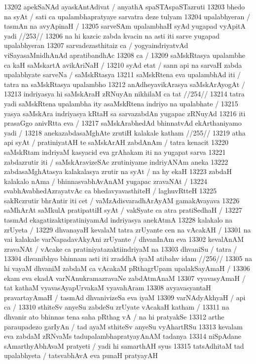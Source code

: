 13202 apekSaNAd ayaskAntAdivat / anyathA spaSTAspaSTazruti  
13203 bhedo na syAt / sati ca upalambhapratyaye sarvatra deze tulyam 
13204 upalabhyeran / tasmAn na avyApinaH /
13205 	sarveSAm upalambhaH syAd yugapad vyApitA yadi //253//
13206 na hi kazcic zabda kvacin na asti iti sarve yugapad upalabhyeran 
13207 sarvadezasthitaiz ca / yogyaindriyatvAd viSayasaMnidhAnAd apratibandhAc
13208 ca / 
13209 	saMskRtasya upalambhe ca kaH saMskartA avikAriNaH / 
13210 syAd etat / sann api na sarvaH zabda upalabhyate sarveNa / saMskRtasya
13211 saMskRtena eva upalambhAd iti / tatra na saMskRtasya upalambho  
13212 anAdheyavikArasya saMskArAyogAt /  
13213 	indriyasya hi saMskAraH zRNuyAn nikhilaM ca tat //254//
13214 tatra yadi saMskRtena upalambha ity asaMskRtena indriyo na upalabhate /
13215 yasya saMskAra indriyasya kRtaH sa sarvazabdAn yugapac zRNuyAd  
13216 iti prasaGgo anivRtta eva /  
13217 	saMskArabhedAd bhinnatvAd ekArthaniyamo yadi / 
13218 	anekazabdasaMghAte zrutiH kalakale katham //255//  
13219 atha api syAt / pratiniyatAH te saMskArAH zabdAnAm / tatra kenacit  
13220 saMskRtam indriyaM kasyacid eva grAhakam iti na yugapat sarva  
13221 zabdazrutir iti / saMskAravizeSAc zrutiniyame indriyANAm aneka 
13222 zabdasaMghAtasya kalakalasya zrutir na syAt / na hy ekaH
13223 zabdaH kalakalo nAma / bhinnasvabhAvAnAM yugapac zravaNAt /
13224 svabhAvabhedAzrayatvAc ca bhedavyavasthiteH / laghuvRtteH 
13225 sakRczrutir bhrAntir iti cet / vaMzAdisvaradhArAyAM gamakAvayava
13226 saMhArAt saMkulA pratipattiH syAt / vakSyate ca atra pratiSedhaH / 
13227 tasmAd ekagatizaktipratiniyamAd indriyasya anekAtmA 
13228 kalakalo na zrUyeta / 
13229 	dhvanayaH kevalaM tatra zrUyante cen na vAcakAH /  
13301 na vai kalakale varNapadavAkyAni zrUyante / dhvanInAm eva 
13302 kevalAnAM zravaNAt / vAcake ca pratiniyatazaktiindriyaM na 
13303 dhvaniSu / tatra /  
13304 	dhvanibhyo bhinnam asti iti zraddhA iyaM atibahv idam //256// 
13305 na hi vayaM dhvaniM zabdaM ca vAcakaM pRthagrUpam upalakSayAmaH /  
13306 ekam eva ekadA varNAnukramazravaNe zabdAtmAnaM  
13307 vyavasyAmaH / tat kathaM vyavasAyapUrvakaM vyavahAram 
13308 avyavasyantaH pravartayAmaH / tasmAd dhvanivizeSa eva iyaM 
13309 varNAdyAkhyaH / api ca /
13310 	sthiteSv anyeSu zabdeSu zrUyate vAcakaH katham / 
13311 na dhvanir ato bhinnas tena saha pRthag vA / na hi pratyakSe 
13312 arthe paraupadezo garIyAn / tad ayaM sthiteSv anyeSu vyAhartRSu 
13313 kevalam eva zabdaM zRNvaMs tadupalambhapratyayAnAM tadanya 
13314 niSpAdane sAmarthyAbhAvaM pratyeti / yadi hi samarthAH syus
13315 tatsAdhitaM tad upalabhyeta / tatsvabhAvA eva punaH pratyayAH 
